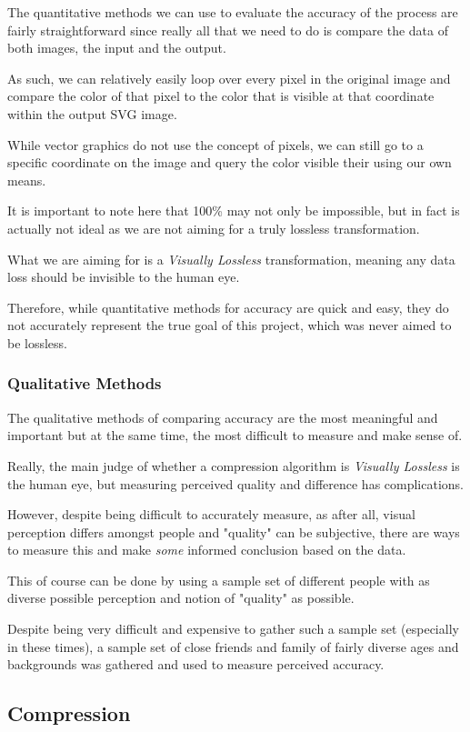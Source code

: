 \documentclass[12pt]{article}
\newcommand{\sentence}{} %
\newcommand{\italic}[1]{\textit{#1}}
\begin{document}
    \tab
    The quantitative methods we can use to evaluate the accuracy of the process are fairly straightforward since
    really all that we need to do is compare the data of both images, the input and the output.
    \sentence
    As such, we can relatively easily loop over every pixel in the original image and compare the color of that pixel
    to the color that is visible at that coordinate within the output SVG image.
    \sentence
    While vector graphics do not use the concept of pixels, we can still go to a specific coordinate on the image and
    query the color visible their using our own means.
    \sentence
    It is important to note here that 100\% may not only be impossible, but in fact is actually not ideal as we are
    not aiming for a truly lossless transformation.
    \sentence
    What we are aiming for is a \italic{Visually Lossless} transformation, meaning any data loss should be invisible
    to the human eye.
    \sentence
    Therefore, while quantitative methods for accuracy are quick and easy, they do not accurately represent the true
    goal of this project, which was never aimed to be lossless.

    \subsubsection{Qualitative Methods}\label{subsubsec:qualitative-methods}

    \tab
    The qualitative methods of comparing accuracy are the most meaningful and important but at the same time, the
    most difficult to measure and make sense of.
    \sentence
    Really, the main judge of whether a compression algorithm is \italic{Visually Lossless} is the human eye, but
    measuring perceived quality and difference has complications.
    \sentence
    However, despite being difficult to accurately measure, as after all, visual perception differs amongst people
    and "quality" can be subjective, there are ways to measure this and make \italic{some} informed conclusion based
    on the data.
    \sentence
    This of course can be done by using a sample set of different people with as diverse possible perception and
    notion of "quality" as possible.
    \sentence
    Despite being very difficult and expensive to gather such a sample set (especially in these times), a sample set
    of close friends and family of fairly diverse ages and backgrounds was gathered and used to measure perceived
    accuracy.

    \subsection{Compression}\label{subsec:compression}
\end{document}

